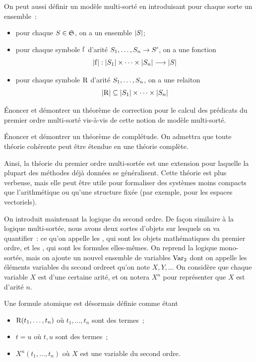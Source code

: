\begin{problem}
  On peut aussi définir un modèle multi-sorté en introduisant pour chaque
  sorte un ensemble~:
  \begin{itemize}
  \item pour chaque $S\in\mathfrak{S}$, on a un ensemble $\left\vert S\right\vert$;
  \item pour chaque symbole $\mathrm{f}$ d'arité
    $S_1,\ldots,S_n \to S'$, on a une fonction
    \[\left\vert \mathrm{f}\right\vert : \displaystyle \left\vert S_1\right\vert\times\cdots\times\left\vert S_n\right\vert \longrightarrow \left\vert S\right\vert
    \]
  \item pour chaque symbole $\mathrm{R}$ d'arité
    $S_1,\ldots,S_n$, on a une relaiton
    \[\left\vert \mathrm{R}\right\vert\subseteq \left\vert S_1\right\vert\times\cdots\times\left\vert S_n\right\vert\]
  \end{itemize}
  \begin{pbQuest}[resume]
  \item \'Enoncer et démontrer un théorème de correction pour le calcul des
    prédicats du premier ordre multi-sorté vis-à-vis de cette notion de modèle
    multi-sorté.
  \item \'Enoncer et démontrer un théorème de complétude. On admettra que toute
    théorie cohérente peut être étendue en une théorie complète.
  \end{pbQuest}

  Ainsi, la théorie du premier ordre multi-sortée est une extension pour
  laquelle la plupart des méthodes déjà données se généralisent. Cette théorie
  est plus verbeuse, mais elle peut être utile pour formaliser des systèmes
  moins compacts que l'arithmétique ou qu'une structure fixée (par exemple,
  pour les espaces vectoriels).


  On introduit maintenant la logique du second ordre. De façon similaire à la
  logique multi-sortée, nous avons deux sortes d'objets sur lesquels on va
  quantifier~: ce qu'on appelle les , qui sont les objets
  mathématiques du premier ordre, et les , qui sont les
  formules elles-mêmes. On reprend la logique mono-sortée, mais on ajoute un
  nouvel ensemble de variables $\operatorname{Var}_2$ dont on appelle les éléments
  \og variables du second ordre\fg et qu'on note $X,Y,\ldots$ On considère que
  chaque variable $X$ est d'une certaine arité, et on notera $X^n$ pour
  représenter que $X$ est d'arité $n$.

  Une formule atomique est désormais définie comme étant
  \begin{itemize}
  \item $\mathrm{R}(t_1,\ldots,t_n)$ où $t_1,\ldots,t_n$ sont des termes~;
  \item $t = u$ où $t,u$ sont des termes~;
  \item $X^n(t_1,\ldots,t_n)$ où $X$ est une variable du second ordre.
  \end{itemize}


\end{problem}
